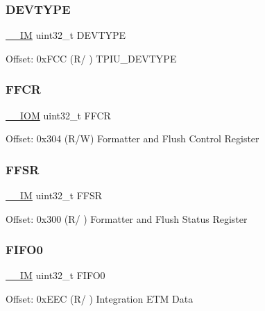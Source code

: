 \subsubsection{\texorpdfstring{D\+E\+V\+T\+Y\+PE}{DEVTYPE}}
{\footnotesize\ttfamily \mbox{\hyperlink{core__cm4_8h_a4cc1649793116d7c2d8afce7a4ffce43}{\+\_\+\+\_\+\+IM}} uint32\+\_\+t D\+E\+V\+T\+Y\+PE}

Offset\+: 0x\+F\+CC (R/ ) T\+P\+I\+U\+\_\+\+D\+E\+V\+T\+Y\+PE \mbox{\label{struct_t_p_i___type_afe3ca1410c32188d26be24c4ee9e180c}} 
\subsubsection{\texorpdfstring{F\+F\+CR}{FFCR}}
{\footnotesize\ttfamily \mbox{\hyperlink{core__cm4_8h_ab6caba5853a60a17e8e04499b52bf691}{\+\_\+\+\_\+\+I\+OM}} uint32\+\_\+t F\+F\+CR}

Offset\+: 0x304 (R/W) Formatter and Flush Control Register \mbox{\label{struct_t_p_i___type_a2a049b49e9da6772d38166397ce8fc70}} 
\subsubsection{\texorpdfstring{F\+F\+SR}{FFSR}}
{\footnotesize\ttfamily \mbox{\hyperlink{core__cm4_8h_a4cc1649793116d7c2d8afce7a4ffce43}{\+\_\+\+\_\+\+IM}} uint32\+\_\+t F\+F\+SR}

Offset\+: 0x300 (R/ ) Formatter and Flush Status Register \mbox{\label{struct_t_p_i___type_ace73d78eff029b698e11cd5cf3efaf94}} 
\subsubsection{\texorpdfstring{F\+I\+F\+O0}{FIFO0}}
{\footnotesize\ttfamily \mbox{\hyperlink{core__cm4_8h_a4cc1649793116d7c2d8afce7a4ffce43}{\+\_\+\+\_\+\+IM}} uint32\+\_\+t F\+I\+F\+O0}

Offset\+: 0x\+E\+EC (R/ ) Integration E\+TM Data \mbox{\label{struct_t_p_i___type_abad7737b3d46cc6d4813d37171d29745}} 
